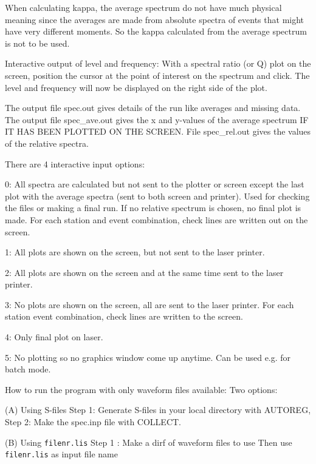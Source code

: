 When calculating kappa, the average spectrum do not have much physical meaning since the averages are made from absolute spectra of events that might have very different moments. So the kappa calculated from the average spectrum is not to be used. 

Interactive output of level and frequency: With a spectral ratio (or Q) plot on the screen, position the cursor at the point of interest on the spectrum and click. The level and frequency will now be displayed on the right side of the plot. 

The output file spec.out gives details of the run like averages and missing data. The output file spec\_ave.out gives the x and y-values of the average spectrum IF IT HAS BEEN PLOTTED ON THE SCREEN. File spec\_rel.out gives the values of the relative spectra. 

There are 4 interactive input options: 

0: All spectra are calculated but not sent to the plotter or screen except the last plot with the average spectra (sent to both screen and printer). Used for checking the files or making a final run. If no relative spectrum is chosen, no final plot is made. For each station and event combination, check lines are written out on the screen. 

1: All plots are shown on the screen, but not sent to the laser printer. 

2: All plots are shown on the screen and at the same time sent to the laser printer. 

3: No plots are shown on the screen, all are sent to the laser printer. For each station event combination, check lines are written to the screen. 

4: Only final plot on laser.

5: No plotting so no graphics window come up anytime. Can be used e.g. for batch mode.

How to run the program with only waveform files available: Two options: 

(A) Using S-files \newline
Step 1: Generate S-files in your local directory with AUTOREG, \newline
Step 2: Make the spec.inp file with COLLECT. 


(B) Using \texttt{filenr.lis} \newline
Step 1 : Make a dirf of waveform files to use \newline
Then use \texttt{filenr.lis} as input file name 



